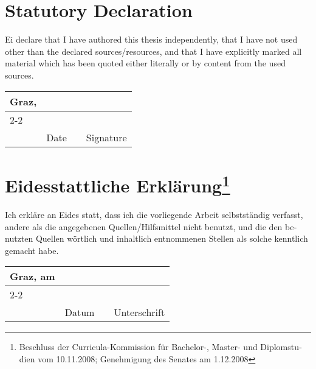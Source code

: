 
\section*{Statutory Declaration}

Ei declare that I have authored this thesis independently, that I have
not used other than the declared sources/resources, and that I have
explicitly marked all material which has been quoted either literally
or by content from the used sources.

\vfill

\newcommand{\mysignatureblock}[3]{%
  \begin{tabular}{llp{2em}l}
  #1 & \hspace{5cm}        & & \hspace{6cm} \\\cline{2-2}\cline{4-4}
     &                     & & \\[-3mm]
     & {\footnotesize #2}  & & {\footnotesize #3}
  \end{tabular}
}

\mysignatureblock{Graz,}{Date}{Signature}

\vfill
\vfill
\vfill
\vfill

\section*{Eidesstattliche Erklärung\footnote{%
\foreignlanguage{ngerman}{Beschluss der Curricula-Kommission für Bachelor-, Master- und
Diplomstudien vom 10.11.2008;
Genehmigung des Senates am 1.12.2008}}}

\foreignlanguage{ngerman}{%
Ich erkläre an Eides statt, dass ich die
vorliegende Arbeit selbstständig verfasst, andere als die angegebenen
Quellen/Hilfsmittel nicht benutzt, und die den benutzten Quellen
wörtlich und inhaltlich entnommenen Stellen als solche kenntlich
gemacht habe.}

\vfill

\mysignatureblock{Graz, am}{Datum}{Unterschrift}


\newpage
\newpage

